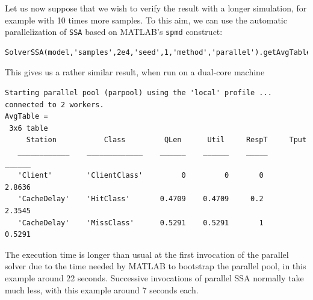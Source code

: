 Let us now suppose that we wish to verify the result with a longer simulation, for example with 10 times more samples. To this aim, we can use the automatic parallelization of \texttt{SSA} based on MATLAB's \texttt{spmd} construct:
\begin{lstlisting}
SolverSSA(model,'samples',2e4,'seed',1,'method','parallel').getAvgTable
\end{lstlisting}
This gives us a rather similar result, when run on a dual-core machine
\begin{lstlisting}
Starting parallel pool (parpool) using the 'local' profile ...
connected to 2 workers.
AvgTable =
 3x6 table
     Station           Class         QLen      Util     RespT     Tput
   ____________    _____________    ______    ______    _____    ______
   'Client'        'ClientClass'         0         0       0     2.8636
   'CacheDelay'    'HitClass'       0.4709    0.4709     0.2     2.3545
   'CacheDelay'    'MissClass'      0.5291    0.5291       1     0.5291
\end{lstlisting}
The execution time is longer than usual at the first invocation of the parallel solver due to the time needed by MATLAB to bootstrap the parallel pool, in this example around 22 seconds. Successive invocations of parallel SSA normally take much less, with this example around 7 seconds each.


